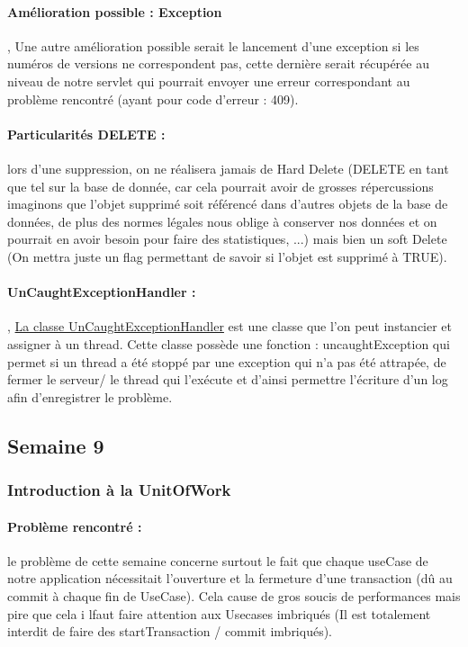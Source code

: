 \documentclass{article}[12pt]
\begin{document}
\paragraph{Amélioration possible : Exception }, Une autre amélioration possible serait le lancement d'une exception si les numéros de versions ne correspondent pas, cette dernière serait récupérée au niveau de notre servlet qui pourrait envoyer une erreur correspondant au problème rencontré (ayant pour code d'erreur : 409).
\paragraph{Particularités DELETE : } lors d'une suppression, on ne réalisera jamais de Hard Delete (DELETE en tant que tel sur la base de donnée, car cela pourrait avoir de grosses répercussions imaginons que l'objet supprimé soit référencé dans d'autres objets de la base de données, de plus des normes légales nous oblige à conserver nos données et on pourrait en avoir besoin pour faire des statistiques, ...) mais bien un soft Delete (On mettra juste un flag permettant de savoir si l'objet est supprimé à TRUE).
\paragraph{UnCaughtExceptionHandler : },  \href{https://docs.oracle.com/javase/7/docs/api/java/lang/Thread.UncaughtExceptionHandler.html}{La classe UnCaughtExceptionHandler}  est une classe que l'on peut instancier et assigner à un thread. Cette classe possède une fonction : uncaughtException qui permet si un thread a été stoppé par une exception qui n'a pas été attrapée, de fermer le serveur/ le thread qui l'exécute et d'ainsi permettre l'écriture d'un log afin d'enregistrer le problème.
\subsection{Semaine 9}
\subsubsection{Introduction à la UnitOfWork}
\paragraph{Problème rencontré : } le problème de cette semaine concerne surtout le fait que chaque useCase de notre application nécessitait l'ouverture et la fermeture d'une transaction (dû au commit à chaque fin de UseCase). Cela cause de gros soucis de performances mais pire que cela i lfaut faire attention aux Usecases imbriqués (Il est totalement interdit de faire des startTransaction / commit imbriqués).
\end{document}
